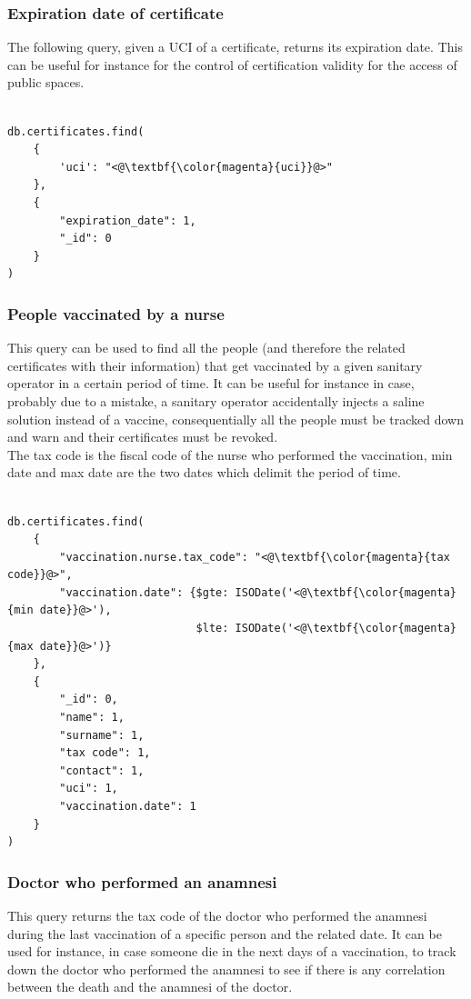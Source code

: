 \documentclass{article}
\begin{document}
\subsubsection{Expiration date of certificate}
The following query, given a UCI of a certificate, returns its expiration date. This can be useful for instance for the control of certification validity for the access of public spaces. 

\begin{lstlisting}[language=cypher, label=lst:cypher-example]

db.certificates.find(
    {
        'uci': "<@\textbf{\color{magenta}{uci}}@>"
    },
    {
        "expiration_date": 1,
        "_id": 0
    }
)

\end{lstlisting}
\subsubsection{People vaccinated by a nurse}
\label{subsec:nurse-query}
This query can be used to find all the people (and therefore the related certificates with their information) that get vaccinated by a given sanitary operator in a certain period of time. It can be useful for instance in case, probably due to a mistake, a sanitary operator accidentally injects a saline solution instead of a vaccine, consequentially all the people must be tracked down and warn and their certificates must be revoked.\\
The tax code is the fiscal code of the nurse who performed the vaccination, min date and max date are the two dates which delimit the period of time.

\begin{lstlisting}[language=cypher, label=lst:cypher-example]

db.certificates.find(
    {
        "vaccination.nurse.tax_code": "<@\textbf{\color{magenta}{tax code}}@>",
        "vaccination.date": {$gte: ISODate('<@\textbf{\color{magenta}{min date}}@>'),
                             $lte: ISODate('<@\textbf{\color{magenta}{max date}}@>')}
    },
    {
        "_id": 0,
        "name": 1,
        "surname": 1,
        "tax code": 1,
        "contact": 1,
        "uci": 1,
        "vaccination.date": 1
    }
)

\end{lstlisting}
\newpage
\subsubsection{Doctor who performed an anamnesi}
This query returns the tax code of the doctor who performed the anamnesi during the last vaccination of a specific person and the related date.
It can be used for instance, in case someone die in the next days of a vaccination, to track down the doctor who performed the anamnesi to see if there is any correlation between the death and the anamnesi of the doctor. 
\end{document}
